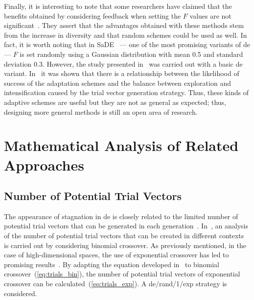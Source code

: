 \documentclass[preprint,3p]{elsarticle}
\newcommand{\DE}{{\sc de}}
\begin{document}
Finally, it is interesting to note that some researchers have claimed that the benefits obtained by considering feedback when
setting the $F$ values are not significant~\cite{Zielinski:08}.
%
They assert that the advantages obtained with these methods stem from the increase in diversity and that random schemes
could be used as well.
%
In fact, it is worth noting that in SaDE~\cite{Qin:09} --- one of the most promising variants of \DE{} ---
$F$ is set randomly using a Gaussian distribution with mean 0.5 and standard deviation 0.3.
%
However, the study presented in~\cite{Zielinski:08} was carried out with a basic \DE{} variant.
%
In~\cite{Segura:14} it was shown that there is a relationship between the likelihood of success of the adaptation schemes and
the balance between exploration and intensification caused by the trial vector generation strategy.
%
Thus, these kinds of adaptive schemes are useful but they are not as general as expected;
thus, designing more general methods is still an open area of research.

%

\section{Mathematical Analysis of Related Approaches}
\label{sec:motivations}

\subsection{Number of Potential Trial Vectors}

The appearance of stagnation in \DE{} is closely related to the limited number of potential trial
vectors that can be generated in each generation~\cite{Lampinen:00,Langdon:07}.
%
In~\cite{Lampinen:00}, an analysis of the number of potential trial vectors that can be created
in different contexts is carried out by considering binomial crossover.
%
As previously mentioned, in the case of high-dimensional spaces, the use of exponential crossover has led to
promising results~\cite{LaTorre:11}.
%
By adapting the equation developed in~\cite{Lampinen:00} to binomial crossover~(\ref{eq:trials_bin}),
the number of potential trial vectors of exponential crossover can be calculated~(\ref{eq:trials_exp}).
%
A \DE{}/rand/1/exp strategy is considered.
\end{document}

